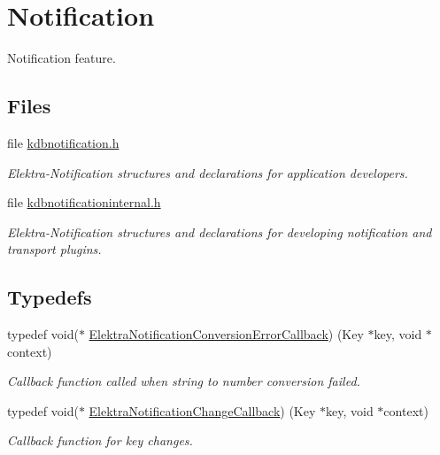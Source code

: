 \hypertarget{group__kdbnotification}{}\section{Notification}
\label{group__kdbnotification}


Notification feature.  


\subsection*{Files}
\begin{DoxyCompactItemize}
\item 
file \hyperlink{kdbnotification_8h}{kdbnotification.\+h}
\begin{DoxyCompactList}\small\item\em Elektra-\/\+Notification structures and declarations for application developers. \end{DoxyCompactList}\item 
file \hyperlink{kdbnotificationinternal_8h}{kdbnotificationinternal.\+h}
\begin{DoxyCompactList}\small\item\em Elektra-\/\+Notification structures and declarations for developing notification and transport plugins. \end{DoxyCompactList}\end{DoxyCompactItemize}
\subsection*{Typedefs}
\begin{DoxyCompactItemize}
\item 
typedef void($\ast$ \hyperlink{group__kdbnotification_gaad19fb981cad906eb9c72bd602c7bb64}{Elektra\+Notification\+Conversion\+Error\+Callback}) (Key $\ast$key, void $\ast$context)
\begin{DoxyCompactList}\small\item\em Callback function called when string to number conversion failed. \end{DoxyCompactList}\item 
typedef void($\ast$ \hyperlink{group__kdbnotification_gad0d800e32a72d89780321e5723301eb9}{Elektra\+Notification\+Change\+Callback}) (Key $\ast$key, void $\ast$context)
\begin{DoxyCompactList}\small\item\em Callback function for key changes. \end{DoxyCompactList}\end{DoxyCompactItemize}
